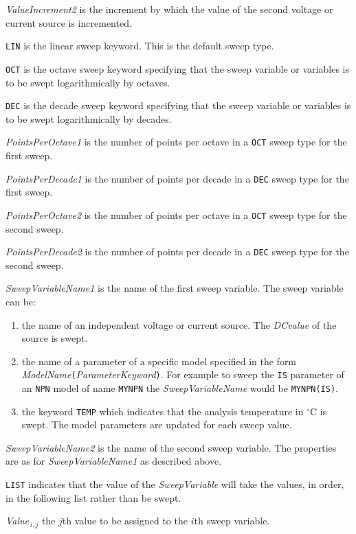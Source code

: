 \begin{widelist}
\item[{\it ValueIncrement2}] is the increment by which the value of the second
voltage or current source is incremented.

\item[{\tt LIN}] is the linear sweep keyword. This is the default sweep type.

\item[{\tt OCT}] is the octave sweep keyword specifying that the sweep
variable or variables is to be swept logarithmically by octaves.

\item[{\tt DEC}] is the decade sweep keyword specifying that the sweep
variable or variables is to be swept logarithmically by decades.

\item[{\it PointsPerOctave1}] is the number of points per octave in a {\tt OCT}
     sweep type for the first sweep.

\item[{\it PointsPerDecade1}] is the number of points per decade in a {\tt DEC}
     sweep type for the first sweep.

\item[{\it PointsPerOctave2}] is the number of points per octave in a {\tt OCT}
     sweep type for the second sweep.

\item[{\it PointsPerDecade2}] is the number of points per decade in a {\tt DEC}
     sweep type for the second sweep.

\item[{\it SweepVariableName1}] is the name of the first sweep variable.
The sweep variable can be:
\begin{enumerate}
\item the name of an independent voltage or current source. The {\it DCvalue}
      of the source is swept.
\item the name of a parameter of a specific model specified in the form
     {\it ModelName}{\tt (}{\it ParameterKeyword}{\tt )}. For example to sweep
     the {\tt IS} parameter of an {\tt NPN} model of name {\tt MYNPN} the
     {\it SweepVariableName} would be {\tt MYNPN(IS)}.
\item the keyword {\tt TEMP} which indicates that the analysis temperature
     in $^{\circ}$C is swept. The model parameters are updated for each
     sweep value.
\end{enumerate}

\item[{\it SweepVariableName2}] is the name of the second sweep variable.
     The properties are as for {\it SweepVariableName1} as described above.

\item[{\tt LIST}] indicates that the value of the {\it SweepVariable} will take the
     values, in order, in the following list rather than be swept.

\item[{\it Value$_{\,i,j}$}] the $j$th value to be assigned to the $i$th sweep
     variable.
\end{widelist}

